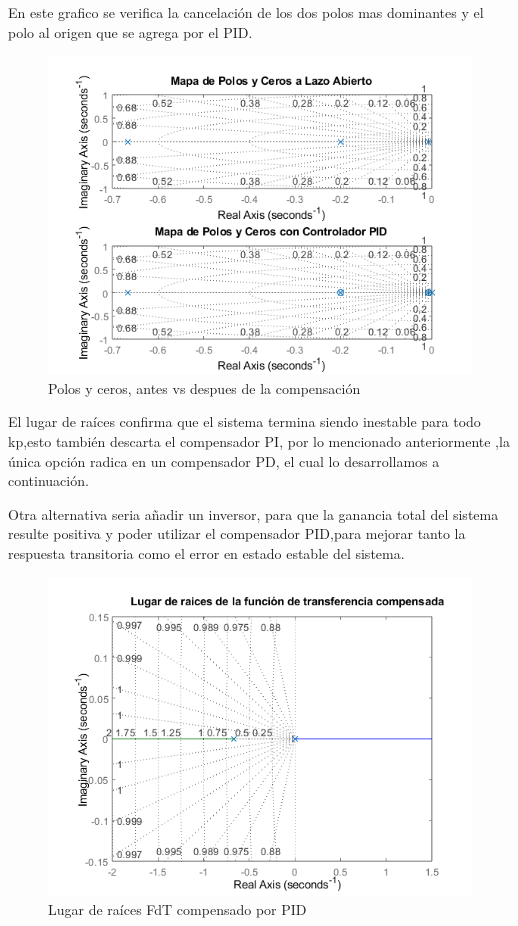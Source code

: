 \documentclass[12pt]{article}
\begin{document}
	En este grafico se verifica la cancelación de los dos polos mas dominantes y el polo al origen que se agrega por el PID.
	\begin{figure}[h!]
		\centering
		\includegraphics[width=1\linewidth]{Imagenes/Pzmap}
		\caption[Polos y ceros, antes vs después de la compensación]{Polos y ceros, antes vs despues de la compensación}
		\label{fig:pzmap}
	\end{figure}
	
	El lugar de raíces confirma que el sistema termina siendo inestable para todo kp,esto también descarta el compensador PI, por lo mencionado anteriormente ,la única opción radica en un compensador PD, el cual lo desarrollamos a continuación.\newline
	
	Otra  alternativa seria añadir un inversor, para que la ganancia total del sistema resulte positiva y poder utilizar el compensador PID,para mejorar tanto la respuesta transitoria como el error en estado estable del sistema.\newpage
	  
	\begin{figure}[bht]
		\centering
		\includegraphics[width=1\linewidth]{Imagenes/Rlocus_comp_PID}
		\caption[Lugar de raíces FdT compensado por PID]{Lugar de raíces FdT compensado por PID}
		\label{fig:rlocuscomppid}
	\end{figure}
	
\end{document}
